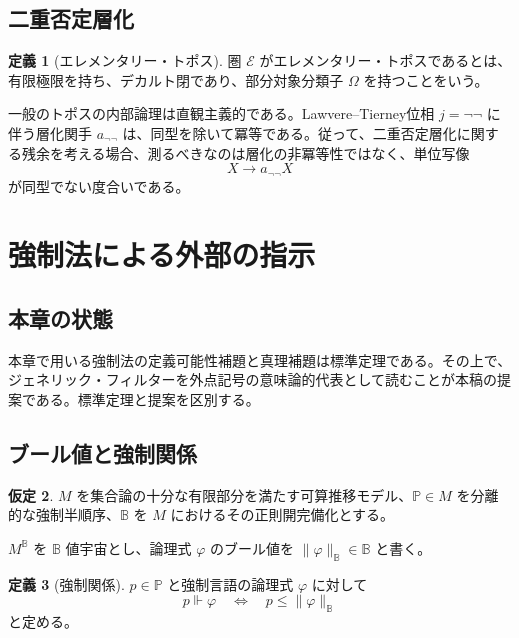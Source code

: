 \documentclass[a4paper,11pt]{ltjsarticle}
\theoremstyle{definition}
\newtheorem{definition}{定義}[section]
\newtheorem{assumption}[definition]{仮定}
\theoremstyle{plain}
\begin{document}
\subsection{二重否定層化}

\begin{definition}[エレメンタリー・トポス]
圏 $\mathcal E$ がエレメンタリー・トポスであるとは、有限極限を持ち、デカルト閉であり、部分対象分類子 $\Omega$ を持つことをいう。
\end{definition}

一般のトポスの内部論理は直観主義的である。Lawvere--Tierney位相 $j=\neg\neg$ に伴う層化関手 $a_{\neg\neg}$ は、同型を除いて冪等である\cite{johnstone}。従って、二重否定層化に関する残余を考える場合、測るべきなのは層化の非冪等性ではなく、単位写像
\begin{equation}
 X\longrightarrow a_{\neg\neg}X
\end{equation}
が同型でない度合いである。

\section{強制法による外部の指示}

\subsection{本章の状態}

本章で用いる強制法の定義可能性補題と真理補題は標準定理である。その上で、ジェネリック・フィルターを外点記号の意味論的代表として読むことが本稿の提案である。標準定理と提案を区別する。

\subsection{ブール値と強制関係}

\begin{assumption}
$M$ を集合論の十分な有限部分を満たす可算推移モデル、$\mathbb P\in M$ を分離的な強制半順序、$\mathbb B$ を $M$ におけるその正則開完備化とする。
\end{assumption}

$M^{\mathbb B}$ を $\mathbb B$ 値宇宙とし、論理式 $\varphi$ のブール値を $\|\varphi\|_{\mathbb B}\in\mathbb B$ と書く。

\begin{definition}[強制関係]
$p\in\mathbb P$ と強制言語の論理式 $\varphi$ に対して
\begin{equation}
 p\Vdash\varphi
 \quad\Longleftrightarrow\quad
 p\leq\|\varphi\|_{\mathbb B}
\end{equation}
と定める。
\end{definition}
\end{document}
